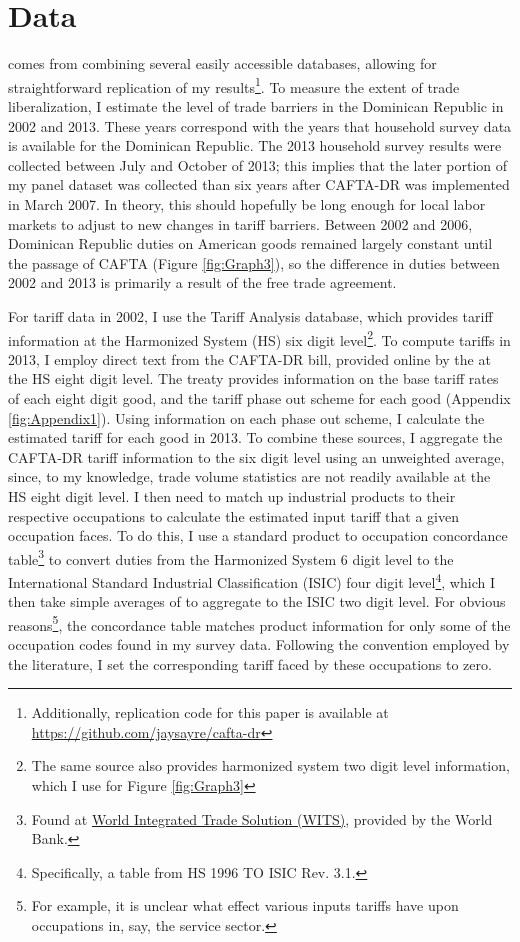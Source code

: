 \chapter{Data}
\label{sec:Data}

 comes from combining several easily accessible databases, allowing
for straightforward replication of my results\footnote{Additionally, replication code for this 
paper is available at \url{https://github.com/jaysayre/cafta-dr}}.
To measure the extent of trade liberalization, I estimate the level of trade barriers in the
Dominican Republic in 2002 and 2013. These years correspond with the years that household
survey data is available for the Dominican Republic. The 2013 household survey results were collected 
between July and October of 2013; this implies
that the later portion of my panel dataset was collected than six years after CAFTA-DR was implemented 
in March 2007. In theory, this should hopefully be long enough for local labor markets to adjust 
to new changes in tariff barriers.
Between 2002 and 2006, Dominican Republic duties on American goods 
remained largely constant until the passage of CAFTA (Figure \ref{fig:Graph3}), so the 
difference in duties between 2002 and 2013 is primarily a result of the free trade agreement.

For tariff data in 2002, 
I use the \citet{wtotariff} Tariff Analysis database, which provides tariff information 
at the Harmonized System (HS) six digit level\footnote{The same source
also provides harmonized system two digit level information,
which I use for Figure \ref{fig:Graph3}}. To compute tariffs in 2013, 
I employ direct text from the CAFTA-DR bill, provided online by the 
\citet{ustraderep} at the HS eight digit level. The treaty provides
information on the base tariff rates of each eight digit good, and the tariff phase out
scheme for each good (Appendix \ref{fig:Appendix1}).
Using information on each phase out scheme, I calculate the estimated tariff
for each good in 2013. To combine these sources, I aggregate
the CAFTA-DR tariff information to the six digit level using an unweighted average, 
since, to my knowledge, trade volume statistics are not readily available at the HS eight digit level.
I then need to match up industrial products to their respective occupations to calculate
the estimated input tariff that a given occupation faces. 
To do this, I use a standard product to occupation concordance table\footnote{Found at 
\href{http://wits.worldbank.org/product_concordance.html}{World Integrated Trade Solution (WITS)}, 
provided by the World Bank.} to convert duties from the Harmonized System 6 digit level to the 
International Standard Industrial Classification (ISIC) four digit 
level\footnote{Specifically, a table from HS 1996 TO ISIC Rev. 3.1.}, which I then take 
simple averages of to aggregate to the ISIC two digit level.
For obvious reasons\footnote{For example, it is unclear what effect various inputs tariffs have
upon occupations in, say, the service sector.}, the concordance table matches product information
for only some of the occupation codes found in my survey data. Following the convention employed 
by the literature, I set the corresponding tariff faced by these occupations to zero.

